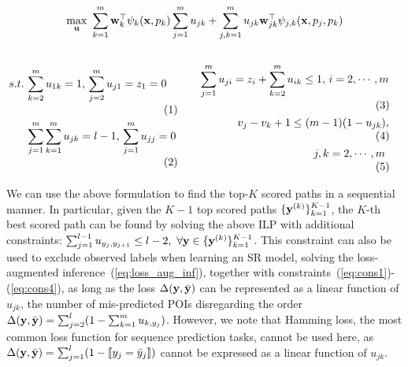 \begin{equation}
\label{eq:obj}
\max_{\mathbf{u}} ~\sum_{k=1}^m \mathbf{w}_k^\top \psi_k(\mathbf{x}, p_k) \sum_{j=1}^m u_{jk} +
            \sum_{j,k=1}^m u_{jk} \mathbf{w}_{jk}^\top \psi_{j, k}(\mathbf{x}, p_j, p_k)
\end{equation}

{$\displaystyle
\begin{minipage}{0.45\linewidth}
\begin{alignat}{2}
s.t. \, 
& \sum_{k=2}^m u_{1k} = 1, \, \sum_{j=2}^m u_{j1} = z_1=0                 \label{eq:cons1} \\
& \sum_{j=1}^m \sum_{k=1}^m u_{jk} = l-1, \, \sum_{j=1}^m u_{jj}=0        \label{eq:cons2}
\end{alignat}
\end{minipage}
\qquad
\begin{minipage}{0.5\linewidth}
\begin{alignat}{3}
\sum_{j=1}^m u_{ji} = z_i + \sum_{k=2}^m u_{ik} \le 1, \, i = 2,\cdots,m  \label{eq:cons3} \\
v_j - v_k + 1 \le (m-1) (1-u_{jk}),                                       \nonumber \\
j,k = 2,\cdots,m~                                                         \label{eq:cons4}
\end{alignat}
\end{minipage}
$}

We can use the above formulation to find the top-$K$ scored paths in a sequential manner. 
In particular, given the $K\!-\!1$ top scored paths $\{\mathbf{y}^{(k)}\}_{k=1}^{K-1}$, 
the $K\!$-th best scored path can be found by solving the above ILP with additional constraints:
$\sum_{j=1}^{l-1} u_{y_j, y_{j+1}} \le l-2, ~\forall \mathbf{y} \in \{\mathbf{y}^{(k)}\}_{k=1}^{K-1}$.
This constraint can also be used to exclude observed labels when learning an SR model, 
\ie solving the loss-augmented inference~(\ref{eq:loss_aug_inf}),
together with constraints~(\ref{eq:cons1})-(\ref{eq:cons4}),
as long as the loss $\Delta(\mathbf{y},\bar{\mathbf{y}})$ can be represented as a linear function of $u_{jk}$,
\eg the number of mis-predicted POIs disregarding the order $\Delta(\mathbf{y}, \bar{\mathbf{y}}) = \sum_{j=2}^l (1 - \sum_{k=1}^m u_{k, y_j})$.
However, we note that Hamming loss, the most common loss function for sequence prediction tasks,
cannot be used here, as $\Delta(\mathbf{y},\bar{\mathbf{y}}) = \sum_{j=1}^l (1 - \llbracket y_j = \bar y_j \rrbracket)$
cannot be expressed as a linear function of $u_{jk}$.

